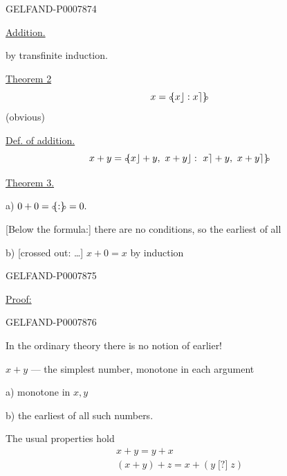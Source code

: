 \begin{GelfandAdjacentEvidence}{GELFAND-P000787}{4}


\underline{Addition.}

by transfinite induction.

\underline{Theorem 2}
\[
x=\mathopen{{\scriptstyle\circ}\mkern-5mu\{} x\rfloor:x\rceil \mathclose{\}\mkern-5mu{\scriptstyle\circ}}
\]
(obvious)

\underline{Def. of addition.}
\[
x+y=\mathopen{{\scriptstyle\circ}\mkern-5mu\{} x\rfloor+y,\ x+y\rfloor:\ x\rceil+y,\ x+y\rceil \mathclose{\}\mkern-5mu{\scriptstyle\circ}}
\]

\underline{Theorem 3.}

a) \(0+0=\mathopen{{\scriptstyle\circ}\mkern-5mu\{} : \mathclose{\}\mkern-5mu{\scriptstyle\circ}}=0.\)

[Below the formula:] there are no conditions, so the earliest of all

b) [crossed out: \ldots{}] \(x+0=x\) by induction
\end{GelfandAdjacentEvidence}
\begin{GelfandAdjacentEvidence}{GELFAND-P000787}{5}


\underline{Proof:}
\end{GelfandAdjacentEvidence}
\begin{GelfandAdjacentEvidence}{GELFAND-P000787}{6}


In the ordinary theory there is no notion of earlier!

\(x+y\) --- the simplest number, monotone in each argument

a) monotone in \(x,y\)

b) the earliest of all such numbers.

The usual properties hold
\begin{gather*}
x+y=y+x\\
(x+y)+z=x+(y\mathbin{\text{[?]}}z)
\end{gather*}
\end{GelfandAdjacentEvidence}


